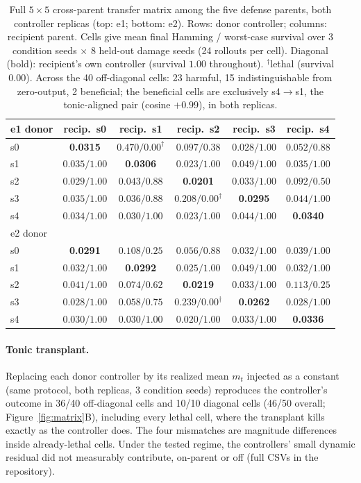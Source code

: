\documentclass{article}
\begin{document}
\begin{table}[h]
\centering
\small
\caption{Full $5{\times}5$ cross-parent transfer matrix among the five
defense parents, both controller replicas (top: e1; bottom: e2). Rows:
donor controller; columns: recipient parent. Cells give mean final
Hamming / worst-case survival over 3 condition seeds $\times$ 8 held-out
damage seeds (24 rollouts per cell). Diagonal
(bold): recipient's own controller (survival $1.00$ throughout).
$^{\dagger}$lethal (survival $0.00$). Across the 40 off-diagonal cells:
23 harmful, 15 indistinguishable from zero-output, 2 beneficial; the beneficial cells are exclusively s4$\to$s1, the tonic-aligned pair
(cosine $+0.99$), in both replicas.}
\label{tab:matrix}
\footnotesize
\setlength{\tabcolsep}{3.5pt}
\begin{tabular}{lccccc}
\toprule
e1 donor & recip.\ s0 & recip.\ s1 & recip.\ s2 & recip.\ s3 & recip.\ s4 \\
\midrule
s0 & \textbf{0.0315} & $0.470/0.00^{\dagger}$ & $0.097/0.38$ & $0.028/1.00$ & $0.052/0.88$ \\
s1 & $0.035/1.00$ & \textbf{0.0306} & $0.023/1.00$ & $0.049/1.00$ & $0.035/1.00$ \\
s2 & $0.029/1.00$ & $0.043/0.88$ & \textbf{0.0201} & $0.033/1.00$ & $0.092/0.50$ \\
s3 & $0.035/1.00$ & $0.036/0.88$ & $0.208/0.00^{\dagger}$ & \textbf{0.0295} & $0.044/1.00$ \\
s4 & $0.034/1.00$ & $0.030/1.00$ & $0.023/1.00$ & $0.044/1.00$ & \textbf{0.0340} \\
\midrule
e2 donor & & & & & \\
\midrule
s0 & \textbf{0.0291} & $0.108/0.25$ & $0.056/0.88$ & $0.032/1.00$ & $0.039/1.00$ \\
s1 & $0.032/1.00$ & \textbf{0.0292} & $0.025/1.00$ & $0.049/1.00$ & $0.032/1.00$ \\
s2 & $0.041/1.00$ & $0.074/0.62$ & \textbf{0.0219} & $0.033/1.00$ & $0.113/0.25$ \\
s3 & $0.028/1.00$ & $0.058/0.75$ & $0.239/0.00^{\dagger}$ & \textbf{0.0262} & $0.028/1.00$ \\
s4 & $0.030/1.00$ & $0.030/1.00$ & $0.020/1.00$ & $0.033/1.00$ & \textbf{0.0336} \\
\bottomrule
\end{tabular}
\end{table}

\paragraph{Tonic transplant.}
Replacing each donor controller by its realized mean $m_t$ injected as a
constant (same protocol, both replicas, 3 condition seeds) reproduces the
controller's outcome in 36/40 off-diagonal cells and 10/10 diagonal cells
(46/50 overall; Figure~\ref{fig:matrix}B), including every lethal cell, where the transplant kills exactly as the controller does. The
four mismatches are magnitude differences inside already-lethal cells.
Under the tested regime, the controllers' small dynamic residual did not
measurably contribute, on-parent or off (full CSVs in the repository).
\end{document}

